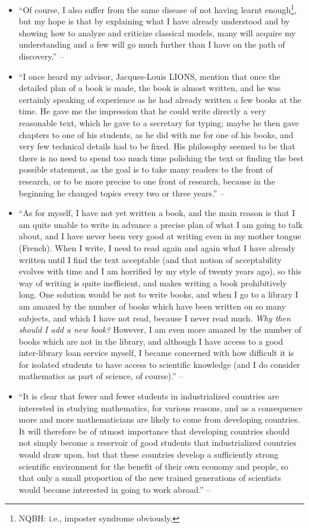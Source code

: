 \documentclass{article}
\numberwithin{equation}{section}
\begin{document}
\begin{enumerate}
\begin{itemize}
		\item ``Of course, I also suffer from the same disease of not having learnt enough\footnote{NQBH: i.e., imposter syndrome obviously.}, but my hope is that by explaining what I have already understood and by showing how to analyze and criticize classical models, many will acquire my understanding and a few will go much further than I have on the path of discovery.'' -- \cite[Preface, p. ix]{Tartar2006}
		\item ``I once heard my advisor, Jacques-Louis LIONS, mention that once the detailed plan of a book is made, the book is almost written, and he was certainly speaking of experience as he had already written a few books at the time. He gave me the impression that he could write directly a very reasonable text, which he gave to a secretary for typing; maybe he then gave chapters to one of his students, as he did with me for one of his books, and very few technical details had to be fixed. His philosophy seemed to be that there is no need to spend too much time polishing the text or finding the best possible statement, as the goal is to take many readers to the front of research, or to be more precise to one front of research, because in the beginning he changed topics every two or three years.'' -- \cite[Preface, p. ix]{Tartar2006}
		\item ``As for myself, I have not yet written a book, and the main reason is that I am quite unable to write in advance a precise plan of what I am going to talk about, and I have never been very good at writing even in my mother tongue (French). When I write, I need to read again and again what I have already written until I find the text acceptable (and that notion of acceptability evolves with time and I am horrified by my style of twenty years ago), so this way of writing is quite inefficient, and makes writing a book prohibitively long. One solution would be not to write books, and when I go to a library I am amazed by the number of books which have been written on so many subjects, and which I have not read, because I never read much. \textit{Why then should I add a new book?} However, I am even more amazed by the number of books which are not in the library, and although I have access to a good inter-library loan service myself, I became concerned with how difficult it is for isolated students to have access to scientific knowledge (and I do consider mathematics as part of science, of course).'' -- \cite[Preface, p. ix]{Tartar2006}
		\item ``It is clear that fewer and fewer students in industrialized countries are interested in studying mathematics, for various reasons, and as a consequence more and more mathematicians are likely to come from developing countries. It will therefore be of utmost importance that developing countries should not simply become a reservoir of good students that industrialized countries would draw upon, but that these countries develop a sufficiently strong scientific environment for the benefit of their own economy and people, so that only a small proportion of the new trained generations of scientists would become interested in going to work abroad.'' -- \cite[Preface, p. ix]{Tartar2006}

\end{itemize}
\end{enumerate}
\end{document}
